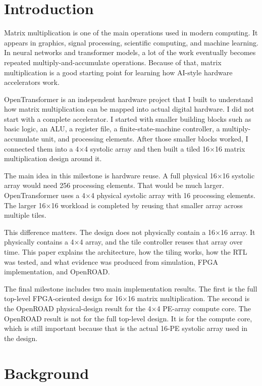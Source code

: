 \documentclass[conference]{IEEEtran}
\begin{document}
\section{Introduction}

Matrix multiplication is one of the main operations used in modern computing. It appears in graphics, signal processing, scientific computing, and machine learning. In neural networks and transformer models, a lot of the work eventually becomes repeated multiply-and-accumulate operations. Because of that, matrix multiplication is a good starting point for learning how AI-style hardware accelerators work.

OpenTransformer is an independent hardware project that I built to understand how matrix multiplication can be mapped into actual digital hardware. I did not start with a complete accelerator. I started with smaller building blocks such as basic logic, an ALU, a register file, a finite-state-machine controller, a multiply-accumulate unit, and processing elements. After those smaller blocks worked, I connected them into a 4$\times$4 systolic array and then built a tiled 16$\times$16 matrix multiplication design around it.

The main idea in this milestone is hardware reuse. A full physical 16$\times$16 systolic array would need 256 processing elements. That would be much larger. OpenTransformer uses a 4$\times$4 physical systolic array with 16 processing elements. The larger 16$\times$16 workload is completed by reusing that smaller array across multiple tiles.

This difference matters. The design does not physically contain a 16$\times$16 array. It physically contains a 4$\times$4 array, and the tile controller reuses that array over time. This paper explains the architecture, how the tiling works, how the RTL was tested, and what evidence was produced from simulation, FPGA implementation, and OpenROAD.

The final milestone includes two main implementation results. The first is the full top-level FPGA-oriented design for 16$\times$16 matrix multiplication. The second is the OpenROAD physical-design result for the 4$\times$4 PE-array compute core. The OpenROAD result is not for the full top-level design. It is for the compute core, which is still important because that is the actual 16-PE systolic array used in the design.

\section{Background}
\end{document}
